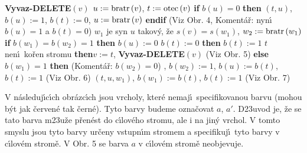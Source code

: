 {\bf Vyvaz-DELETE$\left(v\right)$\newline 
$u:=\operatorname{bratr}\left(v\right)$}, $t:=\operatorname{otec}\left(v\right)$\newline 
{\bf if} $b\left(u\right)=0$ {\bf then}\newline 
\phantom{---}{\bf Rotace}$\left(t,u\right)$, $b\left(u\right):=1$, $b\left(t\right):=0$, $u:=\operatorname{bratr}\left(v\right)$\newline 
{\bf endif\newline}
(Viz Obr. 4, Koment\'a\v r: nyn\'\i\ $b\left(u\right)=1$ a $b\left(t\right)=0$)\newline 
$w_1$ je syn $u$ takov\'y, \v ze $s\left(v\right)=s\left(w_1\right)$, $w_2:=\operatorname{bratr}\left(w_1\right)$\newline 
{\bf if} $b\left(w_1\right)=b\left(w_2\right)=1$ {\bf then}\newline 
\phantom{---}$b\left(u\right):=0$\newline 
\phantom{---}{\bf if} $b\left(t\right):=0$ {\bf then}\newline 
\phantom{------}$b\left(t\right):=1$\newline 
\phantom{---}{\bf else}\newline 
\phantom{------}{\bf if} $t$ nen\'\i\ ko\v ren stromu {\bf then}\newline \phantom{---------}$v:=t$, {\bf Vyvaz-DELETE}$\left(v\right)$\newline 
\phantom{------}{\bf endif}\newline 
\phantom{---}{\bf endif} (Viz Obr. 5)\newline 
{\bf else}\newline 
\phantom{---}{\bf if} $b\left(w_1\right)=1$ {\bf then}\newline 
(Koment\'a\v r: $b\left(w_2\right)=0$)\newline 
\phantom{------}{\bf Rotace$\left(t,u\right)$}, $b\left(w_2\right):=1$, $b\left(u\right):=b\left(t\right)$, $b\left(t\right):=1$ (Viz Obr. 6)\newline 
\phantom{---}{\bf else}\newline 
\phantom{------}{\bf Dvojita-rotace}$\left(t,u,w_1\right)$, $b\left(w_1\right):=b\left(t\right)$, $b\left(t\right):=1$ (Viz Obr. 7)\newline
\phantom{---}{\bf endif\newline 
endif}
\bigskip

\flushpar V n\'asleduj\'\i c\'\i ch obr\'azc\'\i ch jsou vrcholy, kter\'e 
nemaj\'\i\ specifikovanou barvu (mohou b\'yt jak \v cerven\'e tak \v cern\'e).
Tyto barvy budeme ozna\v covat $a$, $a'$. D\accent23uvod je, \v ze se 
tato barva m\accent23u\v ze p\v ren\'est do c\'\i lov\'eho stromu, ale 
i na jin\'y vrchol. V tomto smyslu jsou tyto barvy ur\v ceny vstupn\'\i m 
stromem a specifikuj\'\i\ tyto barvy v c\'\i lov\'em strom\v e. V Obr. 5 
se barva $a$ v c\'\i lov\'em strom\v e neobjevuje.
\medskip


